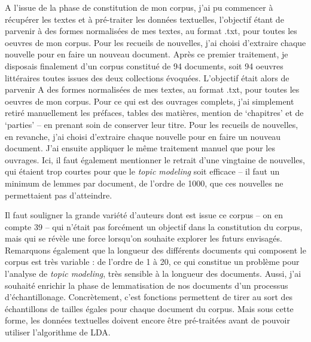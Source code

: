 \documentclass[letterpaper,portrait,12pt]{article}
\begin{document}
	A l'issue de la phase de constitution de mon corpus, j'ai pu commencer \`{a} r\'{e}cup\'{e}rer les textes et \`{a} pr\'{e}-traiter les donn\'{e}es textuelles, l'objectif \'{e}tant de parvenir \`{a} des formes normalis\'{e}es de mes textes, au format .txt, pour toutes les oeuvres de mon corpus. Pour les recueils de nouvelles, j'ai choisi d'extraire chaque nouvelle pour en faire un nouveau document. Apr\`{e}s ce premier traitement, je disposais finalement d'un corpus constitu\'{e} de 94 documents, soit 94 oeuvres litt\'{e}raires toutes issues des deux collections \'{e}voqu\'{e}es. L'objectif \'{e}tait alors de parvenir A des formes normalis\'{e}es de mes textes, au format .txt, pour toutes les oeuvres de mon corpus. Pour ce qui est des ouvrages complets, j'ai simplement retir\'{e} manuellement les pr\'{e}faces, tables des mati\`{e}res, mention de {`}chapitres' et de {`}parties' -- en prenant soin de conserver leur titre. Pour les recueils de nouvelles, en revanche, j'ai choisi d'extraire chaque nouvelle pour en faire un nouveau document. J'ai ensuite appliquer le m\^{e}me traitement manuel que pour les ouvrages. Ici, il faut \'{e}galement mentionner le retrait d'une vingtaine de nouvelles, qui \'{e}taient trop courtes pour que le \emph{topic modeling} soit efficace -- il faut un minimum de lemmes par document, de l'ordre de 1000, que ces nouvelles ne permettaient pas d'atteindre.








	Il faut souligner la grande vari\'{e}t\'{e} d'auteurs dont est issue ce corpus -- on en compte 39 -- qui n'\'{e}tait pas forc\'{e}ment un objectif dans la constitution du corpus, mais qui se r\'{e}v\`{e}le une force lorsqu'on souhaite explorer les futurs envisag\'{e}s. Remarquons \'{e}galement que la longueur des diff\'{e}rents documents qui composent le corpus est tr\`{e}s variable : de l'ordre de 1 \`{a} 20, ce qui constitue un probl\`{e}me pour l'analyse de \emph{topic modeling}, tr\`{e}s sensible \`{a} la longueur des documents.  Aussi, j'ai souhait\'{e} enrichir la phase de lemmatisation de nos documents d'un processus d'\'{e}chantillonage. Concr\`{e}tement, c'est fonctions permettent de tirer au sort des \'{e}chantillons de tailles \'{e}gales pour chaque document du corpus. Mais sous cette forme, les donn\'{e}es textuelles doivent encore \^{e}tre pr\'{e}-trait\'{e}es avant de pouvoir utiliser l'algorithme de LDA.
\end{document}
